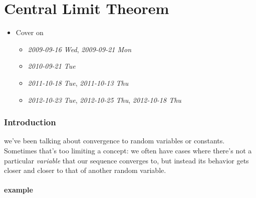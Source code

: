 
\part{Central Limit Theorem}

\begin{itemize}
\item Cover on
\begin{itemize}
\item \textit{2009-09-16 Wed}, \textit{2009-09-21 Mon}
\item \textit{2010-09-21 Tue}
\item \textit{2011-10-18 Tue}, \textit{2011-10-13 Thu}
\item \textit{2012-10-23 Tue}, \textit{2012-10-25 Thu}, \textit{2012-10-18 Thu}
\end{itemize}
\end{itemize}
\section{Introduction}
\label{sec-1}

    we've been talking about convergence to random variables or
    constants.  Sometimes that's too limiting a concept: we often have
    cases where there's not a particular \emph{variable} that our sequence
    converges to, but instead its behavior gets closer and closer to
    that of another random variable.  
\subsection{example}
\label{sec-1-1}


